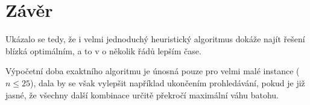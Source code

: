 \documentclass[11pt]{article}
\begin{document}
\section{Závěr}

Ukázalo se tedy, že i velmi jednoduchý heuristický algoritmus dokáže najít řešení blízká optimálním, a to v o několik řádů lepším čase.

Výpočetní doba exaktního algoritmu je únosná pouze pro velmi malé instance ($n \leq 25$), dala by se však vylepšit například ukončením prohledávání, pokud je již jasné, že všechny další kombinace určitě překročí maximální váhu batohu.
\end{document}
